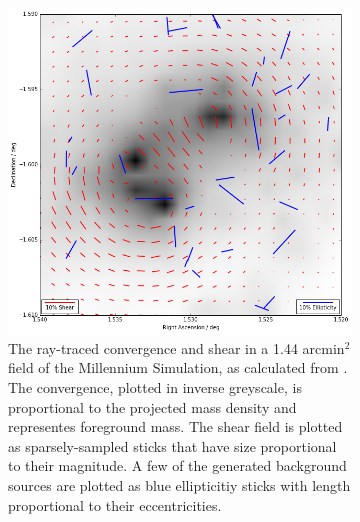 \documentclass[%
 reprint,
 amsmath,amssymb,
 aps,nofootinbib
]{revtex4-1}
\begin{document}
\begin{figure}
    \centering
    \begin{subfigure}[H]{0.45\textwidth}
        \includegraphics[width=\textwidth]{figs-swe/thesis/field2.png}
        \captionsetup{justification=raggedright,singlelinecheck=false}
        \caption{The ray-traced convergence and shear in a 1.44 arcmin$^2$ field of the Millennium Simulation, as calculated from \cite{ray_tracing}. The convergence, plotted in inverse greyscale, is proportional to the projected mass density and representes foreground mass. The shear field is plotted as sparsely-sampled sticks that have size proportional to their magnitude. A few of the generated background sources are plotted as blue ellipticitiy sticks with length proportional to their eccentricities.}
        \label{fig:field2}
    \end{subfigure}
     ~
    \begin{subfigure}[H]{0.45\textwidth}

\end{subfigure}
\end{figure}
\end{document}
